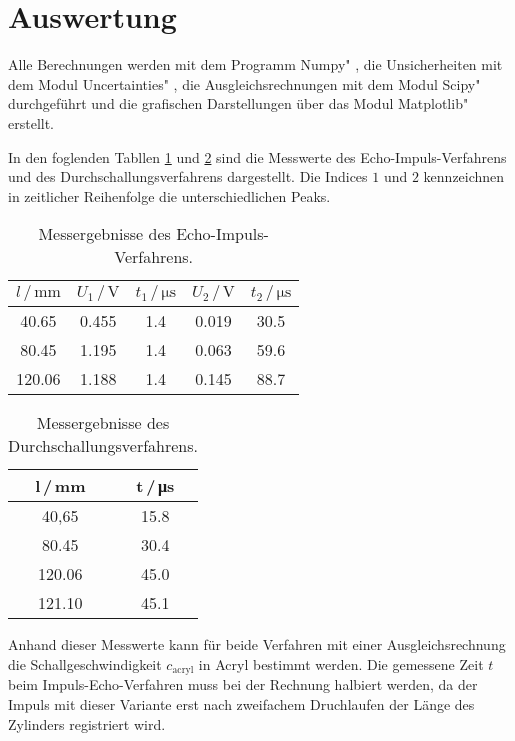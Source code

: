 \section{Auswertung}
\label{sec:Auswertung}
Alle Berechnungen werden mit dem Programm \glqq Numpy" \cite{numpy}, die Unsicherheiten mit dem Modul \glqq Uncertainties" \cite{uncertainties}, die Ausgleichsrechnungen mit dem Modul \glqq Scipy" \cite{scipy} durchgeführt und die grafischen Darstellungen über das Modul \glqq Matplotlib" \cite{matplotlib} erstellt.

In den foglenden Tabllen \ref{tab:impulsecho} und \ref{tab:durchschallung} sind die Messwerte des Echo-Impuls-Verfahrens und 
des Durchschallungsverfahrens dargestellt. Die Indices $1$ und $2$ kennzeichnen in zeitlicher Reihenfolge die unterschiedlichen Peaks.

\begin{table}
    \centering
    \caption{Messergebnisse des Echo-Impuls-Verfahrens.}
    \begin{tabular}{c c c c c}
        \toprule
        $l\,/\,\si{\milli\metre}$ & $U_1\,/\,\si{\volt}$ & $t_1\,/\,\si{\micro\second}$ & $U_2\,/\,\si{\volt}$ & $t_2\,/\,\si{\micro\second}$  \\
        \midrule
          40.65 & 0.455 &  1.4 & 0.019 & 30.5 \\
          80.45 & 1.195 &  1.4 & 0.063 & 59.6 \\
         120.06 & 1.188 &  1.4 & 0.145 & 88.7 \\
        \bottomrule
    \end{tabular}
    \label{tab:impulsecho}
\end{table}

\begin{table}
    \centering
    \caption{Messergebnisse des Durchschallungsverfahrens.}
    \begin{tabular}{c c}
        \toprule
        l\,/\,\si{\milli\metre} & t\,/\,\si{\micro\second} \\
        \midrule
         40,65 & 15.8 \\
         80.45 & 30.4 \\
        120.06 & 45.0 \\
        121.10 & 45.1 \\
        \bottomrule
    \end{tabular}
    \label{tab:durchschallung}
\end{table}

Anhand dieser Messwerte kann für beide Verfahren mit einer Ausgleichsrechnung die Schallgeschwindigkeit $c_\text{acryl}$ in Acryl bestimmt werden.
Die gemessene Zeit $t$ beim Impuls-Echo-Verfahren muss bei der Rechnung halbiert werden, da der Impuls mit dieser Variante erst 
nach zweifachem Druchlaufen der Länge des Zylinders registriert wird.

